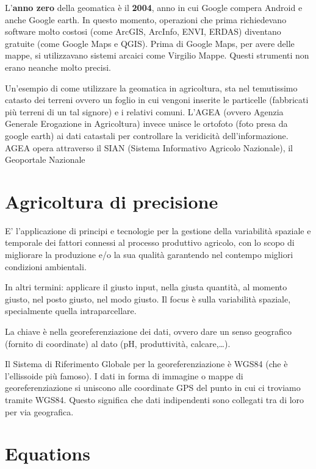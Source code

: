 \documentclass[
]{book}
\theoremstyle{definition}
\theoremstyle{definition}
\theoremstyle{definition}
\theoremstyle{definition}
\theoremstyle{remark}
\begin{document}
L'\textbf{anno zero} della geomatica è il \textbf{2004}, anno in cui Google compera Android e anche Google earth. In questo momento, operazioni che prima richiedevano software molto costosi (come ArcGIS, ArcInfo, ENVI, ERDAS) diventano gratuite (come Google Maps e QGIS). Prima di Google Maps, per avere delle mappe, si utilizzavano sistemi arcaici come Virgilio Mappe. Questi strumenti non erano neanche molto precisi.

Un'esempio di come utilizzare la geomatica in agricoltura, sta nel temutissimo catasto dei terreni ovvero un foglio in cui vengoni inserite le particelle (fabbricati più terreni di un tal signore) e i relativi comuni. L'AGEA (ovvero Agenzia Generale Erogazione in Agricoltura) invece unisce le ortofoto (foto presa da google earth) ai dati catastali per controllare la veridicità dell'informazione. AGEA opera attraverso il SIAN (Sistema Informativo Agricolo Nazionale), il Geoportale Nazionale

\hypertarget{agricoltura-di-precisione}{%
\section{Agricoltura di precisione}\label{agricoltura-di-precisione}}

E' l'applicazione di principi e tecnologie per la gestione della variabilità spaziale e temporale dei fattori connessi al processo produttivo agricolo, con lo scopo di migliorare la produzione e/o la sua qualità garantendo nel contempo migliori condizioni ambientali.

In altri termini: applicare il giusto input, nella giusta quantità, al momento giusto, nel posto giusto, nel modo giusto. Il focus è sulla variabilità spaziale, specialmente quella intraparcellare.

La chiave è nella georeferenziazione dei dati, ovvero dare un senso geografico (fornito di coordinate) al dato (pH, produttività, calcare,\ldots).

Il Sistema di Riferimento Globale per la georeferenziazione è WGS84 (che è l'ellissoide più famoso). I dati in forma di immagine o mappe di georeferenziazione si uniscono alle coordinate GPS del punto in cui ci troviamo tramite WGS84. Questo significa che dati indipendenti sono collegati tra di loro per via geografica.

\hypertarget{equations}{%
\section{Equations}\label{equations}}
\end{document}
